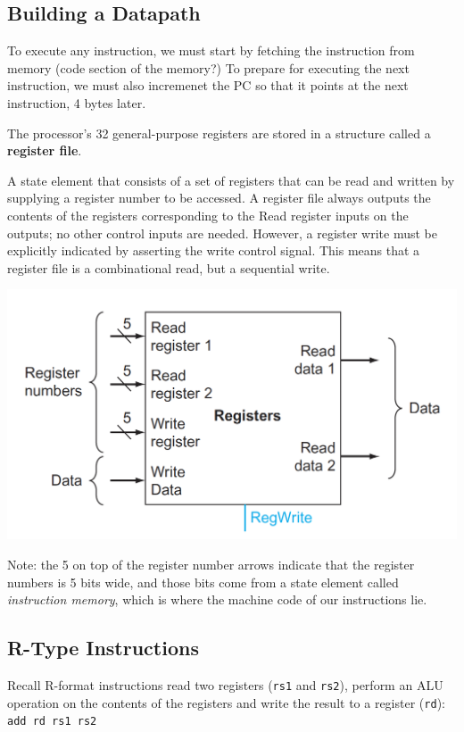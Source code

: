 \documentclass[12pt]{article}
\begin{document}
\subsection*{Building a Datapath}
To execute any instruction, we must start by fetching the instruction from memory (code section of the memory?)
To prepare for executing the next instruction, we must also incremenet the PC so that it points at the next instruction, 4 bytes later.

The processor's 32 general-purpose registers are stored in a structure called a \textbf{register file}.
\begin{definition}
    A state element that consists of a set of registers that can be read and written by supplying a register number to be accessed. A register file always outputs the contents of the registers corresponding to the Read register inputs  on the outputs; no other control inputs are needed. However, a register write must be explicitly indicated by asserting the write control signal. This means that a register file is a combinational read, but a sequential write.

    \begin{center}
        \includegraphics[scale=0.4]{images/register-file.png}
    \end{center}

    Note: the 5 on top of the register number arrows indicate that the register numbers is 5 bits wide, and those bits come from a state element called \emph{instruction memory}, which is where the machine code of our instructions lie.

\end{definition}
\subsection*{R-Type Instructions}
Recall R-format instructions read two registers (\lstinline{rs1} and \lstinline{rs2}), perform an ALU operation on the contents of the registers and write the result to a register (\lstinline{rd}): \lstinline{add rd rs1 rs2}
\end{document}
